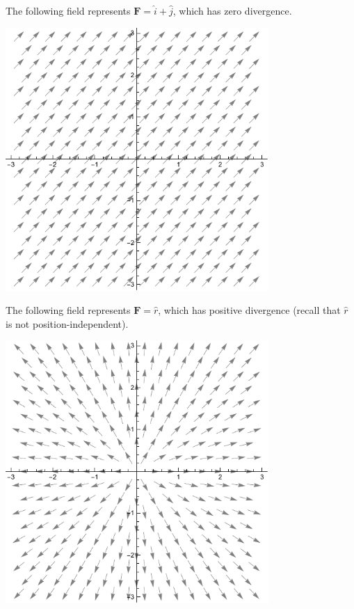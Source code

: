 \documentclass[10pt]{mypackage}
\begin{document}
\begin{example}
  The following field represents $\mathbf{F} = \hat{i} + \hat{j}$, which has zero divergence.
  \begin{center}
    \includegraphics[width=10cm]{images/div0field.pdf}
  \end{center}
  The following field represents $\mathbf{F} = \hat{r}$, which has positive divergence (recall that $\hat{r}$ is not position-independent).
  \begin{center}
    \includegraphics[width=10cm]{images/spreadfield.pdf}
  \end{center}
\end{example}
\end{document}

